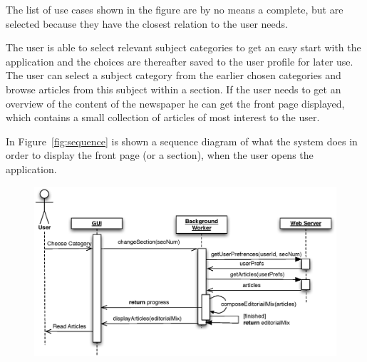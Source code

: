 The list of use cases shown in the figure are by no means a complete, but are selected because they have the closest relation to the user needs.

The user is able to select relevant subject categories to get an easy start with the application and the choices are thereafter saved to the user profile for later use. The user can select a subject category from the earlier chosen categories and browse articles from this subject within a section. If the user needs to get an overview of the content of the newspaper he can get the front page displayed, which contains a small collection of articles of most interest to the user.

In Figure~\ref{fig:sequence} is shown a sequence diagram of what the system does in order to display the front page (or a section), when the user opens the application.
\begin{figure}[h!tp]
	\centering
	
	\def\mygraphic{\includegraphics[width=\textwidth]{img/sequence}}
	\settoheight\graphicheight{\mygraphic}
	\mygraphic
\end{figure}
